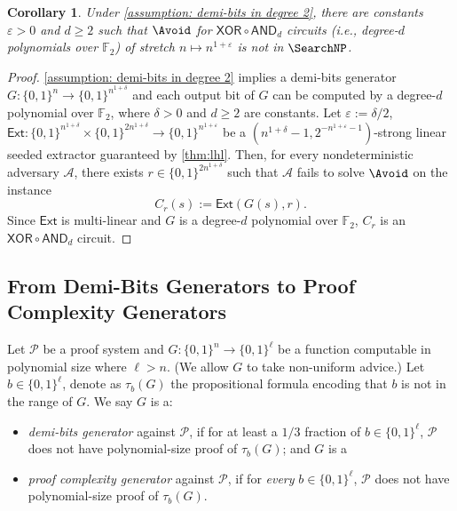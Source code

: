 \documentclass[10pt,a4paper]{article}
\newtheorem{corollary}[theorem]{Corollary}
\theoremstyle{definition}
\theoremstyle{remark}
\newcommand{\eps}{\varepsilon}
\newcommand{\Ext}{\mathsf{Ext}}
\newcommand{\AND}{\mathsf{AND}}
\newcommand{\XOR}{\mathsf{XOR}}
\newcommand{\calA}{\mathcal{A}}
\newcommand{\calP}{\mathcal{P}}
\newcommand{\F}{\mathbb{F}}
\begin{document}
\begin{corollary}
	Under \autoref{assumption: demi-bits in degree 2}, there are constants $\eps > 0$ and $d\ge 2$ such that $\Avoid$ for $\XOR\circ\AND_d$ circuits (i.e., degree-$d$ polynomials over $\F_2$) of stretch $n\mapsto n^{1+\eps}$ is not in $\SearchNP$.
\end{corollary}
\begin{proof}
	\autoref{assumption: demi-bits in degree 2} implies a demi-bits generator $G: \{0, 1\}^n \to \{0, 1\}^{n^{1+\delta}}$ and each output bit of $G$ can be computed by a degree-$d$ polynomial over $\F_2$, where $\delta > 0$ and $d\geq2$ are constants. Let $\eps := \delta/2$, $\Ext: \{0, 1\}^{n^{1+\delta}} \times \{0, 1\}^{2n^{1+\delta}} \to \{0, 1\}^{n^{1+\eps}}$ be a $(n^{1+\delta}-1,2^{-n^{1+\eps}-1})$-strong linear seeded extractor guaranteed by \autoref{thm:lhl}. Then, for every nondeterministic adversary $\calA$, there exists $r \in \{0, 1\}^{2n^{1+\delta}}$ such that $\calA$ fails to solve $\Avoid$ on the instance
	\[C_r(s) := \Ext(G(s), r).\]
	Since $\Ext$ is multi-linear and $G$ is a degree-$d$ polynomial over $\F_2$, $C_r$ is an $\XOR\circ\AND_d$ circuit.
\end{proof}








\subsection{From Demi-Bits Generators to Proof Complexity Generators}\label{subsec:pcg}
\def\hist{\mathsf{hist}}
Let $\calP$ be a proof system and $G: \{0, 1\}^n \to \{0, 1\}^\ell$ be a function computable in polynomial size where $\ell > n$. (We allow $G$ to take non-uniform advice.) Let $b \in \{0, 1\}^\ell$, denote as $\tau_b(G)$ the propositional formula encoding that $b$ is not in the range of $G$. We say $G$ is a:
\begin{itemize}
    \item \emph{demi-bits generator} against $\calP$, if for at least a $1/3$ fraction of $b \in \{0, 1\}^\ell$, $\calP$ does not have polynomial-size proof of $\tau_b(G)$; and $G$ is a
    \item \emph{proof complexity generator} against $\calP$, if for \emph{every} $b\in \{0, 1\}^\ell$, $\calP$ does not have polynomial-size proof of $\tau_b(G)$.
\end{itemize}
\end{document}

